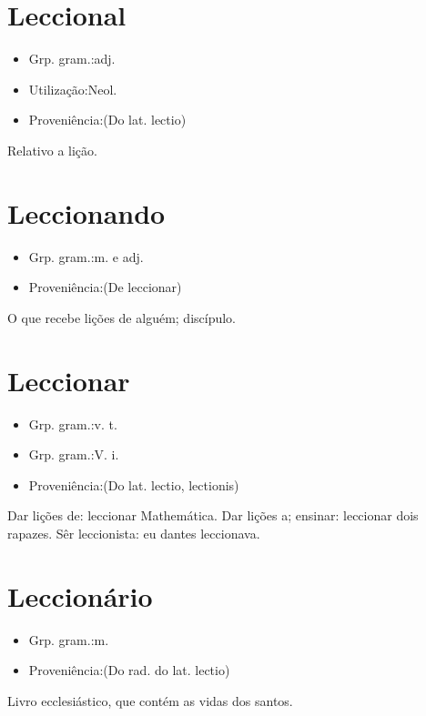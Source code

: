 \section{Leccional}
\begin{itemize}
\item {Grp. gram.:adj.}
\end{itemize}
\begin{itemize}
\item {Utilização:Neol.}
\end{itemize}
\begin{itemize}
\item {Proveniência:(Do lat. \textunderscore lectio\textunderscore )}
\end{itemize}
Relativo a lição.
\section{Leccionando}
\begin{itemize}
\item {Grp. gram.:m.  e  adj.}
\end{itemize}
\begin{itemize}
\item {Proveniência:(De \textunderscore leccionar\textunderscore )}
\end{itemize}
O que recebe lições de alguém; discípulo.
\section{Leccionar}
\begin{itemize}
\item {Grp. gram.:v. t.}
\end{itemize}
\begin{itemize}
\item {Grp. gram.:V. i.}
\end{itemize}
\begin{itemize}
\item {Proveniência:(Do lat. \textunderscore lectio\textunderscore , \textunderscore lectionis\textunderscore )}
\end{itemize}
Dar lições de: \textunderscore leccionar Mathemática\textunderscore .
Dar lições a; ensinar: \textunderscore leccionar dois rapazes\textunderscore .
Sêr leccionista: \textunderscore eu dantes leccionava\textunderscore .
\section{Leccionário}
\begin{itemize}
\item {Grp. gram.:m.}
\end{itemize}
\begin{itemize}
\item {Proveniência:(Do rad. do lat. \textunderscore lectio\textunderscore )}
\end{itemize}
Livro ecclesiástico, que contém as vidas dos santos.
